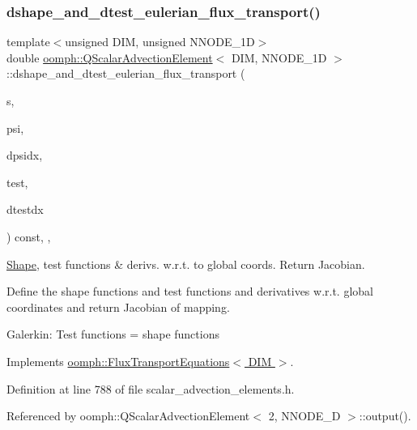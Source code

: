 \subsubsection{\texorpdfstring{dshape\+\_\+and\+\_\+dtest\+\_\+eulerian\+\_\+flux\+\_\+transport()}{dshape\_and\_dtest\_eulerian\_flux\_transport()}}
{\footnotesize\ttfamily template$<$unsigned D\+IM, unsigned N\+N\+O\+D\+E\+\_\+1D$>$ \\
double \hyperlink{classoomph_1_1QScalarAdvectionElement}{oomph\+::\+Q\+Scalar\+Advection\+Element}$<$ D\+IM, N\+N\+O\+D\+E\+\_\+1D $>$\+::dshape\+\_\+and\+\_\+dtest\+\_\+eulerian\+\_\+flux\+\_\+transport (\begin{DoxyParamCaption}\item[{const \hyperlink{classoomph_1_1Vector}{Vector}$<$ double $>$ \&}]{s,  }\item[{\hyperlink{classoomph_1_1Shape}{Shape} \&}]{psi,  }\item[{\hyperlink{classoomph_1_1DShape}{D\+Shape} \&}]{dpsidx,  }\item[{\hyperlink{classoomph_1_1Shape}{Shape} \&}]{test,  }\item[{\hyperlink{classoomph_1_1DShape}{D\+Shape} \&}]{dtestdx }\end{DoxyParamCaption}) const\hspace{0.3cm}{\ttfamily [inline]}, {\ttfamily [protected]}, {\ttfamily [virtual]}}



\hyperlink{classoomph_1_1Shape}{Shape}, test functions \& derivs. w.\+r.\+t. to global coords. Return Jacobian. 

Define the shape functions and test functions and derivatives w.\+r.\+t. global coordinates and return Jacobian of mapping.

Galerkin\+: Test functions = shape functions 

Implements \hyperlink{classoomph_1_1FluxTransportEquations_a9bdf6ab17431bcac6eac11bce917cdde}{oomph\+::\+Flux\+Transport\+Equations$<$ D\+I\+M $>$}.



Definition at line 788 of file scalar\+\_\+advection\+\_\+elements.\+h.



Referenced by oomph\+::\+Q\+Scalar\+Advection\+Element$<$ 2, N\+N\+O\+D\+E\+\_\+D $>$\+::output().

\mbox{\label{classoomph_1_1QScalarAdvectionElement_aeb9bb432fb1662b65e05ffd5a2ac8693}} 
